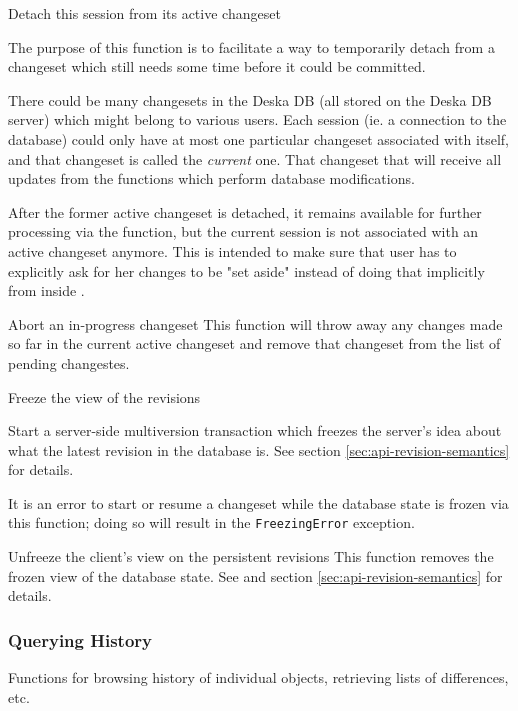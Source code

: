 \documentclass{article}
\begin{document}
    {}
    {Detach this session from its active changeset}
    {The purpose of this function is to facilitate a way to temporarily detach from a changeset which still needs some
    time before it could be committed.

    There could be many changesets in the Deska DB (all stored on the Deska DB server) which might belong to various
    users.  Each session (ie. a connection to the database) could only have at most one particular changeset associated
    with itself, and that changeset is called the {\em current} one.  That changeset that will receive all updates from
    the functions which perform database modifications.

    After the former active changeset is detached, it remains available for further processing via the
     function, but the current session is not associated with an active changeset anymore.
    This is intended to make sure that user has to explicitly ask for her changes to be "set aside" instead of doing
    that implicitly from inside .}

    {Abort an in-progress changeset}
    {This function will throw away any changes made so far in the current active changeset and remove that changeset
    from the list of pending changestes.}

    {Freeze the view of the revisions}
    {Start a server-side multiversion transaction which freezes the server's idea about what the latest revision in the
    database is. See section \ref{sec:api-revision-semantics} for details.

    It is an error to start or resume a changeset while the database state is frozen via this function; doing so will
    result in the {\tt FreezingError} exception.}

    {Unfreeze the client's view on the persistent revisions}
    {This function removes the frozen view of the database state.  See  and section
    \ref{sec:api-revision-semantics} for details.}

\subsubsection{Querying History}
\label{sec:api-group-history}

Functions for browsing history of individual objects, retrieving lists of differences, etc.
\end{document}
